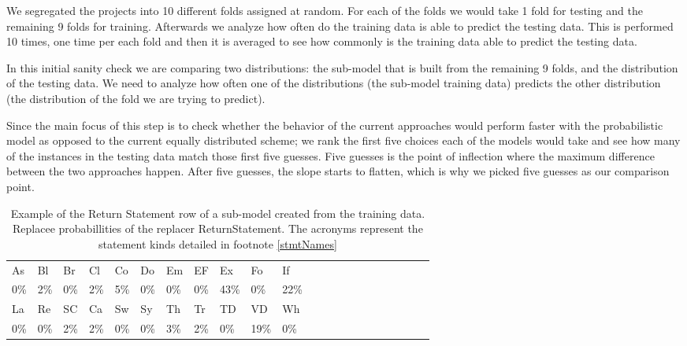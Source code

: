 \documentclass[conference]{IEEEtran}
\begin{document}
We segregated the projects into 10 
different folds assigned at random. For each of the 
folds we would take 1 fold for testing and the remaining 9 folds for training. 
Afterwards we analyze how often do the training data is able to predict the 
testing data. This is performed 10 times, one time per each fold and then it is 
averaged to see how commonly is the training data able to predict the testing 
data.

In this initial sanity check we are comparing two distributions: the sub-model 
that is built from the remaining 9 folds, and the distribution of the testing 
data. We need to analyze how often one of the distributions (the sub-model 
training data) predicts the other distribution (the distribution of the fold we 
are trying to predict). 

Since the main focus of this step is to check whether the behavior of the 
current approaches would perform faster with the probabilistic model as opposed 
to the current equally distributed scheme; we rank the first five choices each 
of the models would take and see how many of the instances in the testing data 
match those first five guesses. Five guesses is the point of inflection where the maximum difference between the two approaches happen. After five guesses, the slope starts to flatten, which is why we picked five guesses as our comparison point.

\begin{table}[ht]
\begin{tabular}{llllllllllllllllllllll}
\hline
As & Bl & Br & Cl & Co & Do & Em & EF & Ex & Fo & If \\
0\%&2\%&0\%&2\%&5\%&0\%&0\%&0\%&43\%&0\%&22\% \\
\hline 
La & Re & SC & Ca & Sw & Sy & Th & Tr & TD & VD & Wh \\
0\%&0\%&2\%&2\%&0\%&0\%&3\%&2\%&0\%&19\%&0\% \\
\hline
\end{tabular}
\\
\caption{Example of the Return Statement row of a sub-model created from 
the training data. Replacee probabillities of the replacer ReturnStatement. The acronyms represent the statement kinds detailed in footnote \ref{stmtNames}}
 \label{fig:exPredReturn} 
\end{table} 

% 
\end{document}

